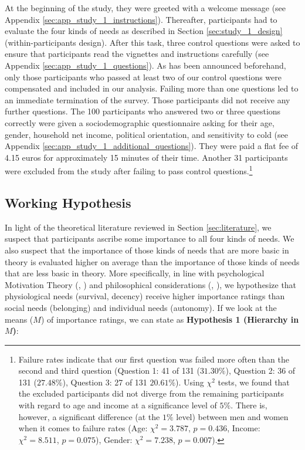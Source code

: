 \documentclass[egregdoesnotlikesansseriftitles]{scrartcl}
\begin{document}
At the beginning of the study, they were greeted with a welcome message (see Appendix \ref{sec:app_study_1_instructions}).
Thereafter, participants had to evaluate the four kinds of needs as described in Section \ref{sec:study_1_design} (within-participants design).
After this task, three control questions were asked to ensure that participants read the vignettes and instructions carefully (see Appendix \ref{sec:app_study_1_questions}).
As has been announced beforehand, only those participants who passed at least two of our control questions were compensated and included in our analysis.
Failing more than one questions led to an immediate termination of the survey.
Those participants did not receive any further questions.
The 100 participants who answered two or three questions correctly were given a sociodemographic questionnaire asking for their age, gender, household net income, political orientation, and sensitivity to cold (see Appendix \ref{sec:app_study_1_additional_questions}).
They were paid a flat fee of 4.15 euros for approximately 15 minutes of their time.
Another 31 participants were excluded from the study after failing to pass control questions.\footnote{Failure rates indicate that our first question was failed more often than the second and third question (Question 1: 41 of 131 ($31.30\%$), Question 2: 36 of 131 ($27.48\%$), Question 3: 27 of 131 $20.61\%$).
Using $\chi^2$ tests, we found that the excluded participants did not diverge from the remaining participants with regard to age and income at a significance level of $5\%$.
There is, however, a significant difference (at the $1\%$ level) between men and women when it comes to failure rates (Age: $\chi^2=3.787$, $p=0.436$, Income: $\chi^2=8.511$, $p=0.075$), Gender: $\chi^2=7.238$, $p=0.007$).}


\subsection{Working Hypothesis}\label{sec:study_1_hypothesis}
In light of the theoretical literature reviewed in Section \ref{sec:literature}, we suspect that participants ascribe some importance to all four kinds of needs.
We also suspect that the importance of those kinds of needs that are more basic in theory is evaluated higher on average than the importance of those kinds of needs that are less basic in theory.
More specifically, in line with psychological Motivation Theory (\citealt{maslow_theory_1943}, \citealt{alderfer_empirical_1969}) and philosophical considerations (\citealt{braybrooke_meeting_1987}, \citealt{wiggins_needs_1987,wiggins_what_1998}), we hypothesize that physiological needs (survival, decency) receive higher importance ratings than social needs (belonging) and individual needs (autonomy).
If we look at the means ($M$) of importance ratings, we can state as \textbf{Hypothesis 1 (Hierarchy in $M$)}:
\end{document}
